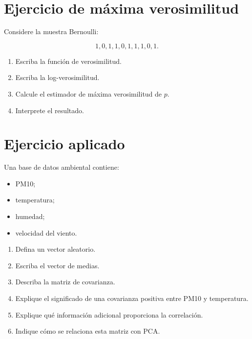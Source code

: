 \documentclass[
  spanish,
  10.5pt,
  letterpaper,
  DIV=11,
  numbers=noendperiod,
  oneside,
  open=any]{scrreprt}
\providecommand{\tightlist}{%
  \setlength{\itemsep}{0pt}\setlength{\parskip}{0pt}}
\theoremstyle{definition}
\theoremstyle{definition}
\theoremstyle{plain}
\theoremstyle{remark}
\begin{document}
\section*{Ejercicio de máxima
verosimilitud}\label{ejercicio-de-muxe1xima-verosimilitud}


Considere la muestra Bernoulli:

\[
1,0,1,1,0,1,1,1,0,1.
\]

\begin{enumerate}
\def\labelenumi{\arabic{enumi}.}
\tightlist
\item
  Escriba la función de verosimilitud.
\item
  Escriba la log-verosimilitud.
\item
  Calcule el estimador de máxima verosimilitud de \(p\).
\item
  Interprete el resultado.
\end{enumerate}

\section*{Ejercicio aplicado}\label{ejercicio-aplicado-1}


Una base de datos ambiental contiene:

\begin{itemize}
\tightlist
\item
  PM10;
\item
  temperatura;
\item
  humedad;
\item
  velocidad del viento.
\end{itemize}

\begin{enumerate}
\def\labelenumi{\arabic{enumi}.}
\tightlist
\item
  Defina un vector aleatorio.
\item
  Escriba el vector de medias.
\item
  Describa la matriz de covarianza.
\item
  Explique el significado de una covarianza positiva entre PM10 y
  temperatura.
\item
  Explique qué información adicional proporciona la correlación.
\item
  Indique cómo se relaciona esta matriz con PCA.
\end{enumerate}
\end{document}
